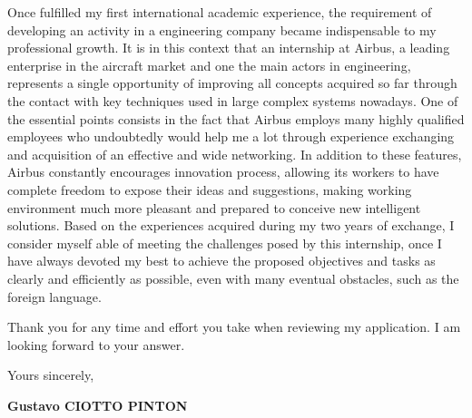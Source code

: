 \documentclass[12pt, a4paper]{article}
\begin{document}
\vspace{12pt}

Once fulfilled my first international academic experience, the requirement of
developing an activity in a engineering company became indispensable to my
professional growth. It is in this context that an internship at Airbus, a
leading enterprise in the aircraft market and one the main actors in
engineering, represents a single opportunity of improving all concepts acquired
so far through the contact with key techniques used in large complex systems
nowadays.  One of the essential points consists in the fact that Airbus employs
many highly qualified employees who undoubtedly would help me a lot through
experience exchanging and acquisition of an effective and wide networking. In
addition  to these features, Airbus constantly encourages innovation process,
allowing its workers to have complete freedom to expose their ideas and
suggestions, making working environment much more pleasant and prepared to
conceive new intelligent solutions. Based on the experiences acquired during my
two years of exchange, I consider myself able of meeting the challenges posed by
this internship, once I have always devoted my best to achieve the proposed
objectives and tasks as clearly and efficiently as possible, even with many
eventual obstacles, such as the foreign language.


\vspace{12pt}


Thank you for any time and effort you take when reviewing my application. I am
looking forward to your answer.

\vspace{12pt}

Yours sincerely,


\vspace{12pt}

\textbf{Gustavo CIOTTO PINTON}
\end{document}
